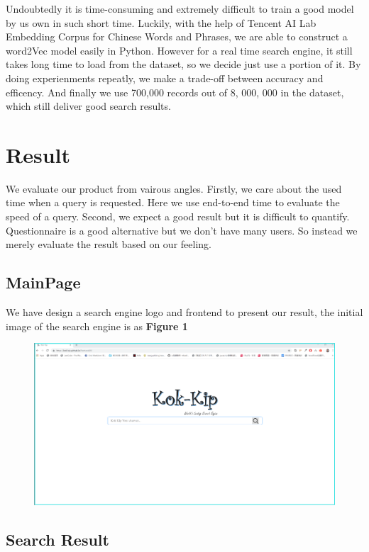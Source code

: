 \documentclass{article}
\begin{document}
Undoubtedly it is time-consuming and extremely difficult to train a good model by us own in such short time. Luckily, with the help of Tencent AI Lab Embedding Corpus for Chinese Words and Phrases, we are able to construct a word2Vec model easily in Python. However for a real time search engine, it still takes long time to load from the dataset, so we decide just use a portion of it. By doing experienments repeatly, we make a trade-off between accuracy and efficency. And finally we use 700,000 records out of 8, 000, 000 in the dataset, which still deliver good search results.


\section{Result}
We evaluate our product from vairous angles. Firstly, we care about the used time when a query is requested. Here we use end-to-end time to evaluate the speed of a query. Second, we expect a good result but it is difficult to quantify. Questionnaire is a good alternative but we don't have many users. So instead we merely evaluate the result based on our feeling. 

\subsection{MainPage}
We have design a search engine logo and frontend to present our result, the initial image of the search engine is as \textbf{Figure 1}
\begin{figure}[H]
	\centering
	\includegraphics[width=0.7\linewidth]{./image/img1}
	\caption{}
	\label{fig:img1}
\end{figure}

\subsection{Search Result}
\end{document}

